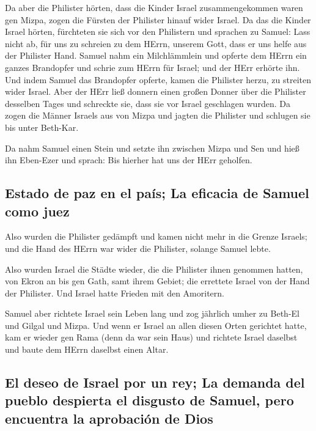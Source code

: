  Da aber die Philister hörten, dass die Kinder Israel
zusammengekommen waren gen Mizpa, zogen die Fürsten der Philister hinauf
wider Israel. Da das die Kinder Israel hörten, fürchteten sie sich vor
den Philistern  und sprachen zu Samuel: Lass nicht ab, für
uns zu schreien zu dem HErrn, unserem Gott, dass er uns helfe aus der
Philister Hand.  Samuel nahm ein Milchlämmlein und opferte
dem HErrn ein ganzes Brandopfer und schrie zum HErrn für Israel; und der
HErr erhörte ihn.  Und indem Samuel das Brandopfer
opferte, kamen die Philister herzu, zu streiten wider Israel. Aber der
HErr ließ donnern einen großen Donner über die Philister desselben Tages
und schreckte sie, dass sie vor Israel geschlagen wurden.
 Da zogen die Männer Israels aus von Mizpa und jagten die
Philister und schlugen sie bis unter Beth-Kar.

 Da nahm Samuel einen Stein und setzte ihn zwischen Mizpa
und Sen und hieß ihn Eben-Ezer und sprach: Bis hierher hat uns der HErr
geholfen.

\hypertarget{estado-de-paz-en-el-pauxeds-la-eficacia-de-samuel-como-juez}{%
\subsection{Estado de paz en el país; La eficacia de Samuel como
juez}\label{estado-de-paz-en-el-pauxeds-la-eficacia-de-samuel-como-juez}}

 Also wurden die Philister gedämpft und kamen nicht mehr
in die Grenze Israels; und die Hand des HErrn war wider die Philister,
solange Samuel lebte.

 Also wurden Israel die Städte wieder, die die Philister
ihnen genommen hatten, von Ekron an bis gen Gath, samt ihrem Gebiet; die
errettete Israel von der Hand der Philister. Und Israel hatte Frieden
mit den Amoritern.

 Samuel aber richtete Israel sein Leben lang
 und zog jährlich umher zu Beth-El und Gilgal und Mizpa.
Und wenn er Israel an allen diesen Orten gerichtet hatte,
 kam er wieder gen Rama (denn da war sein Haus) und
richtete Israel daselbst und baute dem HErrn daselbst einen Altar.

\hypertarget{el-deseo-de-israel-por-un-rey-la-demanda-del-pueblo-despierta-el-disgusto-de-samuel-pero-encuentra-la-aprobaciuxf3n-de-dios}{%
\subsection{El deseo de Israel por un rey; La demanda del pueblo
despierta el disgusto de Samuel, pero encuentra la aprobación de
Dios}\label{el-deseo-de-israel-por-un-rey-la-demanda-del-pueblo-despierta-el-disgusto-de-samuel-pero-encuentra-la-aprobaciuxf3n-de-dios}}

